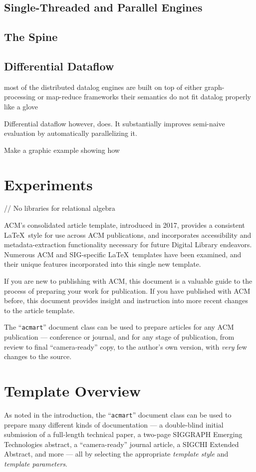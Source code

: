 \subsection{Single-Threaded and Parallel Engines}

\subsection{The Spine}

\subsection{Differential Dataflow}

most of the distributed datalog engines are built on top of either graph-processing or map-reduce frameworks
their semantics do not fit datalog properly like a glove

Differential dataflow however, does. It substantially improves semi-naive evaluation by automatically parallelizing it.

Make a graphic example showing how

\section{Experiments}

// No libraries for relational algebra


ACM's consolidated article template, introduced in 2017, provides a
consistent \LaTeX\ style for use across ACM publications, and
incorporates accessibility and metadata-extraction functionality
necessary for future Digital Library endeavors. Numerous ACM and
SIG-specific \LaTeX\ templates have been examined, and their unique
features incorporated into this single new template.

If you are new to publishing with ACM, this document is a valuable
guide to the process of preparing your work for publication. If you
have published with ACM before, this document provides insight and
instruction into more recent changes to the article template.

The ``\verb|acmart|'' document class can be used to prepare articles
for any ACM publication --- conference or journal, and for any stage
of publication, from review to final ``camera-ready'' copy, to the
author's own version, with {\itshape very} few changes to the source.

\section{Template Overview}
As noted in the introduction, the ``\verb|acmart|'' document class can
be used to prepare many different kinds of documentation --- a
double-blind initial submission of a full-length technical paper, a
two-page SIGGRAPH Emerging Technologies abstract, a ``camera-ready''
journal article, a SIGCHI Extended Abstract, and more --- all by
selecting the appropriate {\itshape template style} and {\itshape
		template parameters}.

